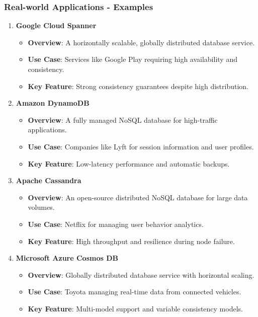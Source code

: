 \documentclass[aspectratio=169]{beamer}
\begin{document}
\begin{frame}[fragile]
    \frametitle{Real-world Applications - Examples}
    \begin{enumerate}
        \item \textbf{Google Cloud Spanner}
            \begin{itemize}
                \item \textbf{Overview}: A horizontally scalable, globally distributed database service.
                \item \textbf{Use Case}: Services like Google Play requiring high availability and consistency.
                \item \textbf{Key Feature}: Strong consistency guarantees despite high distribution.
            \end{itemize}
        
        \item \textbf{Amazon DynamoDB}
            \begin{itemize}
                \item \textbf{Overview}: A fully managed NoSQL database for high-traffic applications.
                \item \textbf{Use Case}: Companies like Lyft for session information and user profiles.
                \item \textbf{Key Feature}: Low-latency performance and automatic backups.
            \end{itemize}
        
        \item \textbf{Apache Cassandra}
            \begin{itemize}
                \item \textbf{Overview}: An open-source distributed NoSQL database for large data volumes.
                \item \textbf{Use Case}: Netflix for managing user behavior analytics.
                \item \textbf{Key Feature}: High throughput and resilience during node failure.
            \end{itemize}
        
        \item \textbf{Microsoft Azure Cosmos DB}
            \begin{itemize}
                \item \textbf{Overview}: Globally distributed database service with horizontal scaling.
                \item \textbf{Use Case}: Toyota managing real-time data from connected vehicles.
                \item \textbf{Key Feature}: Multi-model support and variable consistency models.
            \end{itemize}
    \end{enumerate}
\end{frame}
\end{document}

